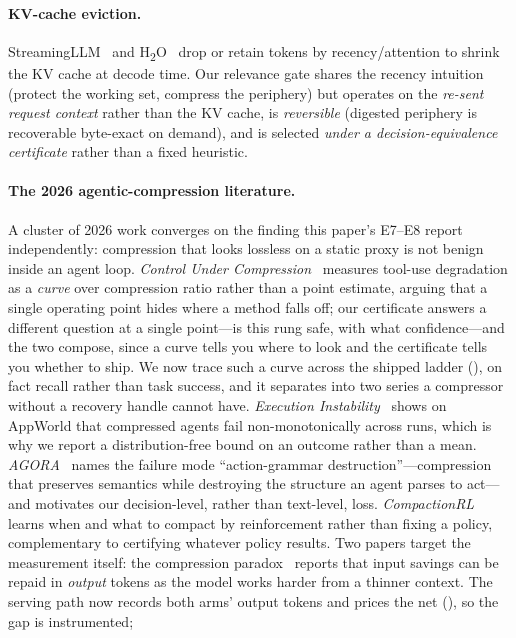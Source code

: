 \documentclass[11pt]{article}
\begin{document}
\paragraph{KV-cache eviction.} StreamingLLM~\cite{streamingllm} and
H\textsubscript{2}O~\cite{h2o} drop or retain tokens by recency/attention to shrink the
KV cache at decode time. Our relevance gate shares the recency intuition (protect the
working set, compress the periphery) but operates on the \emph{re-sent request context}
rather than the KV cache, is \emph{reversible} (digested periphery is recoverable
byte-exact on demand), and is selected \emph{under a decision-equivalence certificate}
rather than a fixed heuristic.
\paragraph{The 2026 agentic-compression literature.} A cluster of 2026 work converges on
the finding this paper's E7--E8 report independently: compression that looks lossless on a
static proxy is not benign inside an agent loop. \emph{Control Under
Compression}~\cite{controlcompression} measures tool-use degradation as a \emph{curve} over
compression ratio rather than a point estimate, arguing that a single operating point hides
where a method falls off; our certificate answers a different question at a single
point---is this rung safe, with what confidence---and the two compose, since a curve tells
you where to look and the certificate tells you whether to ship. We now trace such a curve
across the shipped ladder (), on fact recall rather than task success,
and it separates into two series a compressor without a recovery handle cannot have. \emph{Execution
Instability}~\cite{execinstability} shows on AppWorld that compressed agents fail
non-monotonically across runs, which is why we report a distribution-free bound on an
outcome rather than a mean. \emph{AGORA}~\cite{agora} names the failure mode
``action-grammar destruction''---compression that preserves semantics while destroying the
structure an agent parses to act---and motivates our decision-level, rather than
text-level, loss. \emph{CompactionRL}~\cite{compactionrl} learns when and what to compact
by reinforcement rather than fixing a policy, complementary to certifying whatever policy
results. Two papers target the measurement itself: the compression
paradox~\cite{compressionparadox} reports that input savings can be repaid in \emph{output}
tokens as the model works harder from a thinner context. The serving path now records both
arms' output tokens and prices the net (), so the gap is instrumented;
\end{document}

